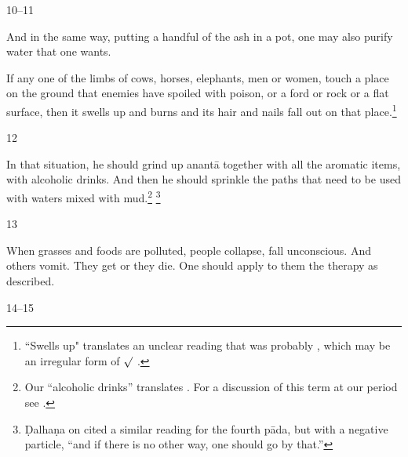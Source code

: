 \begin{translation}
\item [10--11]

And in the same way, putting a handful of the ash in a pot, one may also purify water that 
one wants.

If any one of the limbs of cows, horses, elephants, men or women, touch a place on
the ground that enemies have spoiled with poison, or a ford or rock or a flat
surface, then it swells up and burns and its hair and nails fall out on that
place.\footnote{``Swells up" translates an unclear reading that was probably
    , which may be an irregular form of $\surd$ 
    \citep[see][175--176]{whit-root}.}

\item [12]

In that situation, he should grind up \gls{anantā} together with all the aromatic
items, with alcoholic drinks.  And then  he should sprinkle the paths that need to
be used with waters mixed with mud.\footnote{Our “alcoholic drinks” translates
    .  For a discussion of this term at our period see \cite[37--39
    \emph{et passim}]{mchu-2021a}.} \footnote{Ḍalhaṇa on  cited a similar reading for the fourth
        pāda, but with a negative particle,  “and if there is no other way, one should go
        by that.”}
    
    

\item [13]

When grasses and foods are polluted, people collapse, fall unconscious. And others
vomit. They get  or they die.
One should apply to them the therapy as described.

\item [14--15]


\end{translation}
